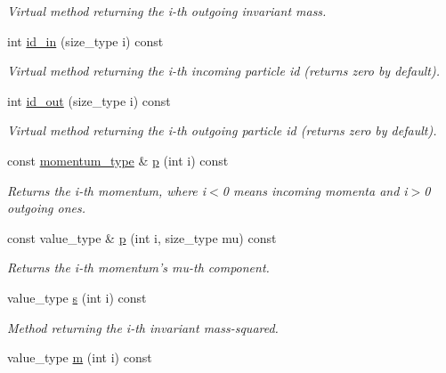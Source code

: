 \begin{DoxyCompactItemize}
\begin{DoxyCompactList}\small\item\em Virtual method returning the i-\/th outgoing invariant mass. \end{DoxyCompactList}\item 
int \hyperlink{a00529_a07fed7558892782e27d85ee4fe009c83}{id\-\_\-in} (size\-\_\-type i) const 
\begin{DoxyCompactList}\small\item\em Virtual method returning the i-\/th incoming particle id (returns zero by default). \end{DoxyCompactList}\item 
int \hyperlink{a00529_a9670babe6e6eb25f8d13102043e7da2f}{id\-\_\-out} (size\-\_\-type i) const 
\begin{DoxyCompactList}\small\item\em Virtual method returning the i-\/th outgoing particle id (returns zero by default). \end{DoxyCompactList}\item 
const \hyperlink{a00559}{momentum\-\_\-type} \& \hyperlink{a00529_a1448d1b1703d189b695bc5a574f3ffd0}{p} (int i) const 
\begin{DoxyCompactList}\small\item\em Returns the i-\/th momentum, where i$<$0 means incoming momenta and i$>$0 outgoing ones. \end{DoxyCompactList}\item 
\hypertarget{a00529_a13b9a1c17155b45fd90e69ef4e087ce1}{const value\-\_\-type \& \hyperlink{a00529_a13b9a1c17155b45fd90e69ef4e087ce1}{p} (int i, size\-\_\-type mu) const }\label{a00529_a13b9a1c17155b45fd90e69ef4e087ce1}

\begin{DoxyCompactList}\small\item\em Returns the i-\/th momentum's mu-\/th component. \end{DoxyCompactList}\item 
\hypertarget{a00529_a7ef0a6b94591f6da82a783d41e6b7262}{value\-\_\-type \hyperlink{a00529_a7ef0a6b94591f6da82a783d41e6b7262}{s} (int i) const }\label{a00529_a7ef0a6b94591f6da82a783d41e6b7262}

\begin{DoxyCompactList}\small\item\em Method returning the i-\/th invariant mass-\/squared. \end{DoxyCompactList}\item 
\hypertarget{a00529_a17f38c3c0f5e5ba5c4e30e058473f038}{value\-\_\-type \hyperlink{a00529_a17f38c3c0f5e5ba5c4e30e058473f038}{m} (int i) const }\label{a00529_a17f38c3c0f5e5ba5c4e30e058473f038}


\end{DoxyCompactItemize}
